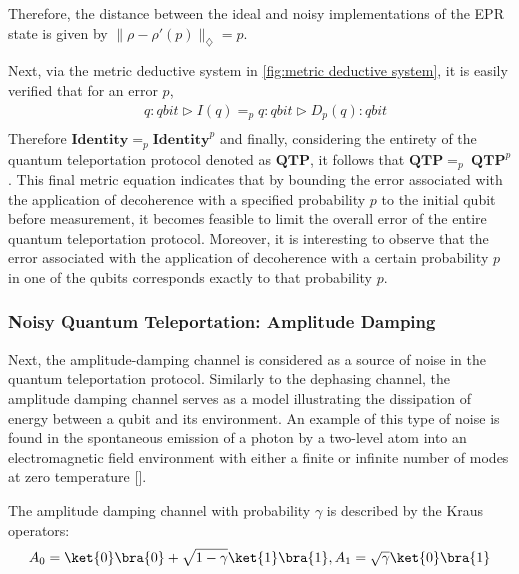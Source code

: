 Therefore, the distance between the ideal and noisy implementations of the EPR state is given by $\lVert \rho-\rho'(p) \rVert_{\diamondsuit} = p$.

Next, via the metric deductive system in \autoref{fig:metric deductive system}, it is easily verified that for an error $p$,
\begin{equation}
\begin{split}
    &q: \textit{qbit}  \triangleright  I (q) =_{p} q: \textit{qbit} \triangleright D_{p} (q)  : \textit{qbit} \\    
\end{split}
\end{equation}
Therefore $\textbf{Identity} =_{p} \textbf{Identity}^{p}$ and finally, considering the entirety of the quantum teleportation protocol denoted as $\textbf{QTP}$, it follows that $\textbf{QTP} =_{p} \hspace{3pt}\textbf{QTP}^{p}$. This final metric equation indicates that by bounding the error associated with the application of decoherence with a specified probability $p$ to the initial qubit before measurement, it becomes feasible to limit the overall error of the entire quantum teleportation protocol. Moreover, it is interesting to observe that the error associated with the application of decoherence with a certain probability $p$ in one of the qubits corresponds exactly to that probability $p$.

\subsubsection{Noisy Quantum Teleportation: Amplitude Damping}
Next, the amplitude-damping channel is considered as a source of noise in the quantum teleportation protocol. Similarly to the dephasing channel, the amplitude damping channel serves as a model illustrating the dissipation of energy between a qubit and its environment. An example of this type of noise is found in the spontaneous emission of a photon by a two-level atom into an electromagnetic field environment with either a finite or infinite number of modes at zero temperature [\cite{salles2008experimental, Wang_2011}].


The amplitude damping channel with probability $\gamma$ is described by the Kraus operators:
\begin{equation}
     A_{0}= \ket{0} \bra{0} + \sqrt{1-\gamma} \ket{1} \bra{1} ,  A_{1}= \sqrt{\gamma} \ket{0} \bra{1}
\end{equation}


